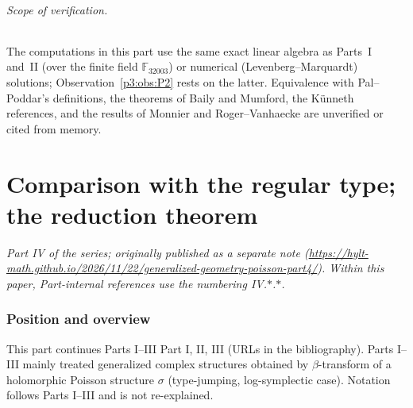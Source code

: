 \paragraph{Scope of verification.}The computations in this part use the same exact linear algebra as Parts~I and~II (over the finite field $\mathbb F_{32003}$) or numerical (Levenberg--Marquardt) solutions; Observation~\ref{p3:obs:P2} rests on the latter. Equivalence with Pal--Poddar's definitions, the theorems of Baily and Mumford, the K\"unneth references, and the results of Monnier and Roger--Vanhaecke are unverified or cited from memory.



\clearpage
\part{Comparison with the regular type; the reduction theorem}
\setcounter{section}{0}
\noindent\textit{Part IV of the series; originally published as a separate note (\url{https://hylt-math.github.io/2026/11/22/generalized-geometry-poisson-part4/}). Within this paper, Part-internal references use the numbering IV.$\ast$.$\ast$.}\par
\section{Position and overview}\label{p4:sec:intro}
This part continues Parts I--III Part I, II, III (URLs in the bibliography). Parts I--III mainly treated generalized complex structures obtained by $\beta$-transform of a holomorphic Poisson structure $\sigma$ (type-jumping, log-symplectic case). Notation follows Parts I--III and is not re-explained.

